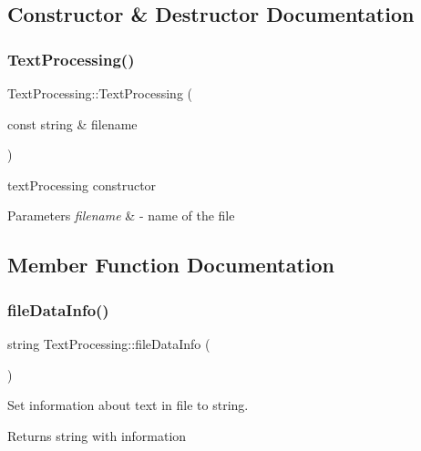 \subsection{Constructor \& Destructor Documentation}
\mbox{\label{class_text_processing_a399a994c517098464e6baf626b9eec41}} 
\subsubsection{\texorpdfstring{Text\+Processing()}{TextProcessing()}}
{\footnotesize\ttfamily Text\+Processing\+::\+Text\+Processing (\begin{DoxyParamCaption}\item[{const string \&}]{filename }\end{DoxyParamCaption})}



text\+Processing constructor 


\begin{DoxyParams}{Parameters}
{\em filename} & -\/ name of the file \\
\hline
\end{DoxyParams}


\subsection{Member Function Documentation}
\mbox{\label{class_text_processing_a0d8e701ef911b7094b071a6505ed3b38}} 
\subsubsection{\texorpdfstring{file\+Data\+Info()}{fileDataInfo()}}
{\footnotesize\ttfamily string Text\+Processing\+::file\+Data\+Info (\begin{DoxyParamCaption}{ }\end{DoxyParamCaption})}



Set information about text in file to string. 

\begin{DoxyReturn}{Returns}
string with information 
\end{DoxyReturn}
\mbox{\label{class_text_processing_a80fe1430413b1f5d7b5d36c9cb0ef826}} 

